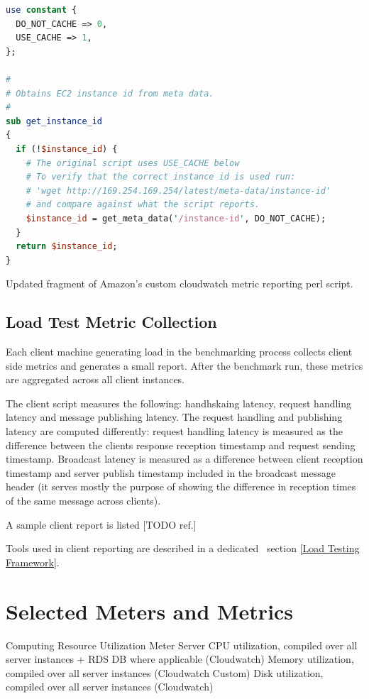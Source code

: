 \documentclass{uvamscse}
\begin{document}
\begin{sourcecode}
\begin{lstlisting}[style=mono, language=perl]
use constant {
  DO_NOT_CACHE => 0,
  USE_CACHE => 1,
};

#
# Obtains EC2 instance id from meta data.
#
sub get_instance_id
{
  if (!$instance_id) {
    # The original script uses USE_CACHE below
    # To verify that the correct instance id is used run:
    # 'wget http://169.254.169.254/latest/meta-data/instance-id'
    # and compare against what the script reports.
    $instance_id = get_meta_data('/instance-id', DO_NOT_CACHE);
  }
  return $instance_id;
}
\end{lstlisting}
\caption{Updated fragment of Amazon's custom cloudwatch metric reporting perl script.}
\label{lstlisting:perl}
\end{sourcecode}

\subsection{Load Test Metric Collection}

Each client machine generating load in the benchmarking process collects client side metrics and generates a small report. After the benchmark run, these metrics are aggregated across all client instances.

The client script measures the following: handhskaing latency, request handling latency and message publishing latency. The request handling and publishing latency are computed differently: request handling latency is measured as the difference between the clients response reception timestamp and request sending timestamp. Broadcast latency is measured as a difference between client reception timestamp and server publish timestamp included in the broadcast message header (it serves mostly the purpose of showing the difference in reception times of the same message across clients).

A sample client report is listed [TODO ref.]

Tools used in client reporting are described in a dedicated  section \ref{Load Testing Framework}.

\section{Selected Meters and Metrics}\label{Selected Meters and Metrics}
Computing Resource Utilization Meter
Server CPU utilization, compiled over all server instances + RDS DB where applicable (Cloudwatch)
Memory utilization, compiled over all server instances (Cloudwatch Custom)
Disk utilization, compiled over all server instances (Cloudwatch)
\end{document}

